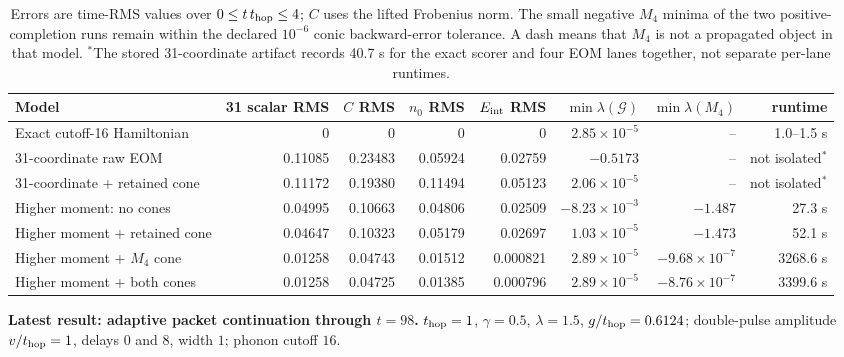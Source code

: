 \documentclass[10pt]{article}
\begin{document}
\begin{table}[htbp]
  \centering
  \tiny
  \setlength{\tabcolsep}{2.2pt}
  \begin{tabular}{@{}lrrrrrrr@{}}
    \toprule
    Model & 31 scalar RMS & $C$ RMS & $n_0$ RMS & $E_{\rm int}$ RMS
        & $\min\lambda(\mathcal G)$ & $\min\lambda(M_4)$ & runtime \\
    \midrule
    Exact cutoff-16 Hamiltonian
      & 0 & 0 & 0 & 0
      & $2.85\times10^{-5}$ & -- & 1.0--1.5 s \\
    31-coordinate raw EOM
      & 0.11085 & 0.23483 & 0.05924 & 0.02759
      & $-0.5173$ & -- & not isolated$^{*}$ \\
    31-coordinate + retained cone
      & 0.11172 & 0.19380 & 0.11494 & 0.05123
      & $2.06\times10^{-5}$ & -- & not isolated$^{*}$ \\
    Higher moment: no cones
      & 0.04995 & 0.10663 & 0.04806 & 0.02509
      & $-8.23\times10^{-3}$ & $-1.487$ & 27.3 s \\
    Higher moment + retained cone
      & 0.04647 & 0.10323 & 0.05179 & 0.02697
      & $1.03\times10^{-5}$ & $-1.473$ & 52.1 s \\
    Higher moment + $M_4$ cone
      & 0.01258 & 0.04743 & 0.01512 & 0.000821
      & $2.89\times10^{-5}$ & $-9.68\times10^{-7}$ & 3268.6 s \\
    Higher moment + both cones
      & 0.01258 & 0.04725 & 0.01385 & 0.000796
      & $2.89\times10^{-5}$ & $-8.76\times10^{-7}$ & 3399.6 s \\
    \bottomrule
  \end{tabular}
  \caption{Errors are time-RMS values over $0\le t\,t_{\rm hop}\le4$;
  $C$ uses the lifted Frobenius norm.  The small negative $M_4$ minima of the
  two positive-completion runs remain within the declared $10^{-6}$ conic
  backward-error tolerance.  A dash means that $M_4$ is not a propagated
  object in that model. $^{*}$The stored 31-coordinate artifact records
  40.7 s for the exact scorer and four EOM lanes together, not separate
  per-lane runtimes.}
\end{table}

\clearpage

\begin{center}
\small
\textbf{Latest result: adaptive packet continuation through $t=98$.}
$t_{\rm hop}=1$, $\gamma=0.5$, $\lambda=1.5$, $g/t_{\rm hop}=0.6124$;
double-pulse amplitude $v/t_{\rm hop}=1$, delays $0$ and $8$, width $1$;
phonon cutoff $16$.
\end{center}
\end{document}
